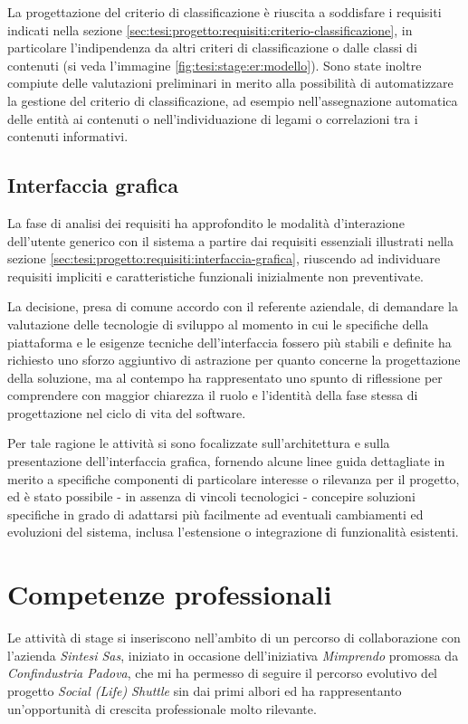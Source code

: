 La progettazione del criterio di classificazione è riuscita a soddisfare i requisiti indicati nella sezione \ref{sec:tesi:progetto:requisiti:criterio-classificazione}, in particolare l'indipendenza da altri criteri di classificazione o dalle classi di contenuti (si veda l'immagine \ref{fig:tesi:stage:er:modello}). Sono state inoltre compiute delle valutazioni preliminari in merito alla possibilità di automatizzare la gestione del criterio di classificazione, ad esempio nell'assegnazione automatica delle entità ai contenuti o nell'individuazione di legami o correlazioni tra i contenuti informativi.

\subsection{Interfaccia grafica}
La fase di analisi dei requisiti ha approfondito le modalità d'interazione dell'utente generico con il sistema a partire dai requisiti essenziali illustrati nella sezione \ref{sec:tesi:progetto:requisiti:interfaccia-grafica}, riuscendo ad individuare requisiti impliciti e caratteristiche funzionali inizialmente non preventivate. 

La decisione, presa di comune accordo con il referente aziendale, di demandare la valutazione delle tecnologie di sviluppo al momento in cui le specifiche della piattaforma e le esigenze tecniche dell'interfaccia fossero più stabili e definite ha richiesto uno sforzo aggiuntivo di astrazione per quanto concerne la progettazione della soluzione, ma al contempo ha rappresentato uno spunto di riflessione per comprendere con maggior chiarezza il ruolo e l'identità della fase stessa di progettazione nel ciclo di vita del software.

Per tale ragione le attività si sono focalizzate sull'architettura e sulla presentazione dell'interfaccia grafica, fornendo alcune linee guida dettagliate in merito a specifiche componenti di particolare interesse o rilevanza per il progetto, ed è stato possibile - in assenza di vincoli tecnologici - concepire soluzioni specifiche in grado di adattarsi più facilmente ad eventuali cambiamenti ed evoluzioni del sistema, inclusa l'estensione o integrazione di funzionalità esistenti.

\section{Competenze professionali}
Le attività di stage si inseriscono nell'ambito di un percorso di collaborazione con l'azienda \textit{Sintesi Sas}, iniziato in occasione dell'iniziativa \textit{Mimprendo} promossa da \textit{Confindustria Padova}, che mi ha permesso di seguire il percorso evolutivo del progetto \textit{Social (Life) Shuttle} sin dai primi albori ed ha rappresentanto un'opportunità di crescita professionale molto rilevante.

